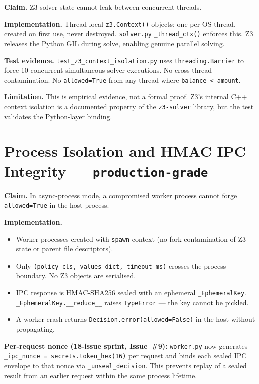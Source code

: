 \documentclass[12pt,a4paper,oneside]{report}
\newcommand{\fname}[1]{\texttt{#1}}          %
\newcommand{\code}[1]{\texttt{#1}}           %
\begin{document}
\textbf{Claim.}  Z3 solver state cannot leak between concurrent threads.

\textbf{Implementation.}  Thread-local \code{z3.Context()} objects: one
per OS thread, created on first use, never destroyed.  \fname{solver.py}
\code{\_thread\_ctx()} enforces this.  Z3 releases the Python GIL during
solve, enabling genuine parallel solving.

\textbf{Test evidence.}  \fname{test\_z3\_context\_isolation.py} uses
\code{threading.Barrier} to force 10 concurrent simultaneous solver
executions.  No cross-thread contamination.  No \code{allowed=True}
from any thread where \code{balance < amount}.

\textbf{Limitation.}  This is empirical evidence, not a formal proof.
Z3's internal C++ context isolation is a documented property of the
\code{z3-solver} library, but the test validates the Python-layer
binding.

\section{Process Isolation and HMAC IPC Integrity --- \code{production-grade}}

\textbf{Claim.}  In async-process mode, a compromised worker process cannot
forge \code{allowed=True} in the host process.

\textbf{Implementation.}

\begin{itemize}
  \item Worker processes created with \code{spawn} context (no fork
        contamination of Z3 state or parent file descriptors).
  \item Only \code{(policy\_cls, values\_dict, timeout\_ms)} crosses the
        process boundary.  No Z3 objects are serialised.
  \item IPC response is HMAC-SHA256 sealed with an ephemeral
        \code{\_EphemeralKey}.  \code{\_EphemeralKey.\_\_reduce\_\_} raises
        \code{TypeError} --- the key cannot be pickled.
  \item A worker crash returns \code{Decision.error(allowed=False)} in the
        host without propagating.
\end{itemize}

\textbf{Per-request nonce (18-issue sprint, Issue~\#9):} \fname{worker.py}
now generates \code{\_ipc\_nonce = secrets.token\_hex(16)} per request and
binds each sealed IPC envelope to that nonce via \code{\_unseal\_decision}.
This prevents replay of a sealed result from an earlier request within the
same process lifetime.
\end{document}
